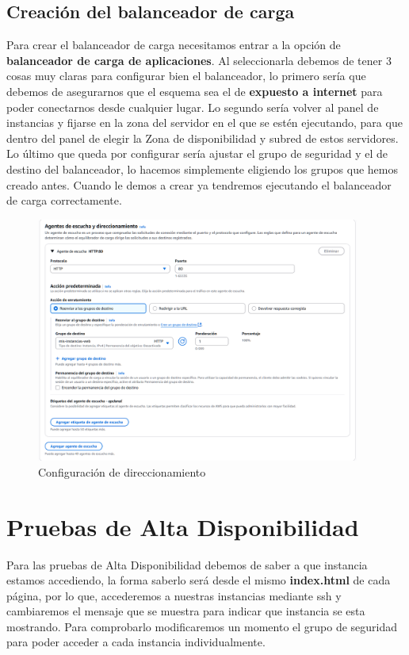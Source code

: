 \documentclass{article}
\begin{document}
\subsection{Creación del balanceador de carga}

Para crear el balanceador de carga necesitamos entrar a la opción de \textbf{balanceador de carga de aplicaciones}. Al seleccionarla debemos de tener 3 cosas muy claras para configurar bien el balanceador, lo primero sería que debemos de asegurarnos que el esquema sea el de \textbf{expuesto a internet} para poder conectarnos desde cualquier lugar. Lo segundo sería volver al panel de instancias y fijarse en la zona del servidor en el que se estén ejecutando, para que dentro del panel de  elegir la Zona de disponibilidad y subred de estos servidores. Lo último que queda por configurar sería ajustar el grupo de seguridad y el de destino del balanceador, lo hacemos simplemente eligiendo los grupos que hemos creado antes. Cuando le demos a crear ya tendremos ejecutando el balanceador de carga correctamente.

	\begin{figure}[H]
	\centering
	\includegraphics[width=0.95\textwidth]{agentes_de_escucha.png}
	\caption{Configuración de direccionamiento}
	\end{figure}

\section{Pruebas de Alta Disponibilidad}

	Para las pruebas de Alta Disponibilidad debemos de saber a que instancia estamos accediendo, la forma saberlo será desde el mismo \textbf{index.html} de cada página, por lo que, accederemos a nuestras instancias mediante ssh y cambiaremos el mensaje que se muestra para indicar que instancia se esta mostrando. Para comprobarlo modificaremos un momento el grupo de seguridad para poder acceder a cada instancia individualmente.
\end{document}
